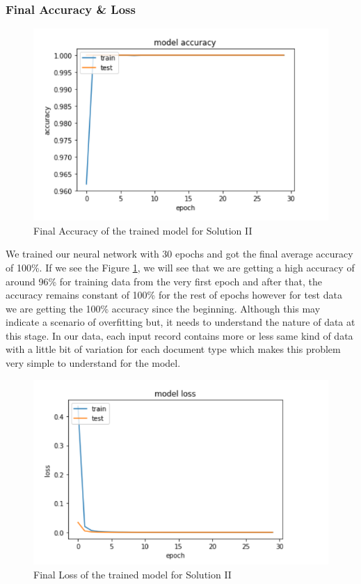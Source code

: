 \subsubsection{Final Accuracy \& Loss}
\begin{figure}[H]
\centering
\includegraphics[scale=0.7]{images/Chapter5/sol_2/acc_graph.png}
\caption{Final Accuracy of the trained model for Solution II}
\label{acc_sol2}
\end{figure}
\par
We trained our neural network with 30 epochs and got the final average accuracy of 100\%. If we see the Figure \ref{acc_sol2}, we will see that we are getting a high accuracy of around 96\% for training data from the very first epoch and after that, the accuracy remains constant of 100\% for the rest of epochs however for test data we are getting the 100\% accuracy since the beginning. Although this may indicate a scenario of overfitting but, it needs to understand the nature of data at this stage. In our data, each input record contains more or less same kind of data with a little bit of variation for each document type which makes this problem very simple to understand for the model.
\begin{figure}[H]
\centering
\includegraphics[scale=0.7]{images/Chapter5/sol_2/loss_graph.png}
\caption{Final Loss of the trained model  for Solution II}
\label{loss_sol2}
\end{figure}
